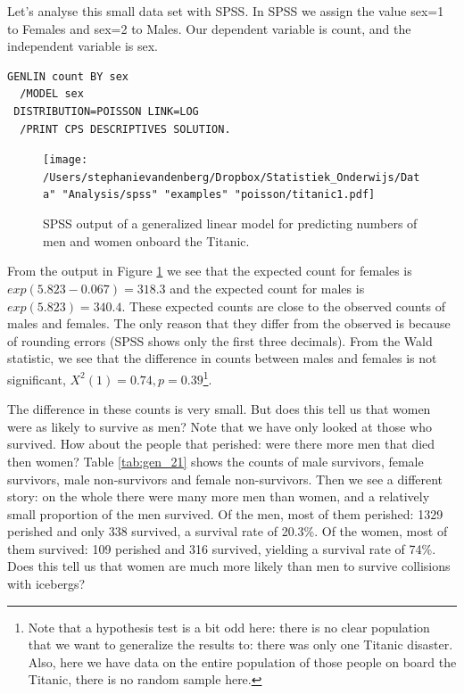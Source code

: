 \documentclass[]{report}\usepackage[]{graphicx}\usepackage[]{color}
\begin{document}
Let's analyse this small data set with SPSS. In SPSS we assign the value sex=1 to Females and sex=2 to Males. Our dependent variable is count, and the independent variable is sex.

\begin{verbatim}
GENLIN count BY sex
  /MODEL sex
 DISTRIBUTION=POISSON LINK=LOG
  /PRINT CPS DESCRIPTIVES SOLUTION.
\end{verbatim}


\begin{figure}[h]
    \begin{center}
       \texttt{[image: /Users/stephanievandenberg/Dropbox/Statistiek\_Onderwijs/Data" "Analysis/spss" "examples" "poisson/titanic1.pdf]}
    \end{center}
     \caption{SPSS output of a generalized linear model for predicting numbers of men and women onboard the Titanic.}
    \label{fig:titanic1}
\end{figure}


From the output in Figure \ref{fig:titanic1} we see that the expected count for females is $exp(5.823-0.067)=318.3$ and the expected count for males is $exp(5.823)=340.4$. These expected counts are close to the observed counts of males and females. The only reason that they differ from the observed is because of rounding errors (SPSS shows only the first three decimals). From the Wald statistic, we see that the difference in counts between males and females is not significant, $X^2(1)=0.74, p=0.39$\footnote{Note that a hypothesis test is a bit odd here: there is no clear population that we want to generalize the results to: there was only one Titanic disaster. Also, here we have data on the entire population of those people on board the Titanic, there is no random sample here.}.

The difference in these counts is very small. But does this tell us that women were as likely to survive as men? Note that we have only looked at those who survived. How about the people that perished: were there more men that died then women? Table \ref{tab:gen_21} shows the counts of male survivors, female survivors, male non-survivors and female non-survivors. Then we see a different story: on the whole there were many more men than women, and a relatively small proportion of the men survived. Of the men, most of them perished: 1329 perished and only 338 survived, a survival rate of 20.3\%. Of the women, most of them survived: 109 perished and 316 survived, yielding a survival rate of 74\%. Does this tell us that women are much more likely than men to survive collisions with icebergs?
\end{document}
